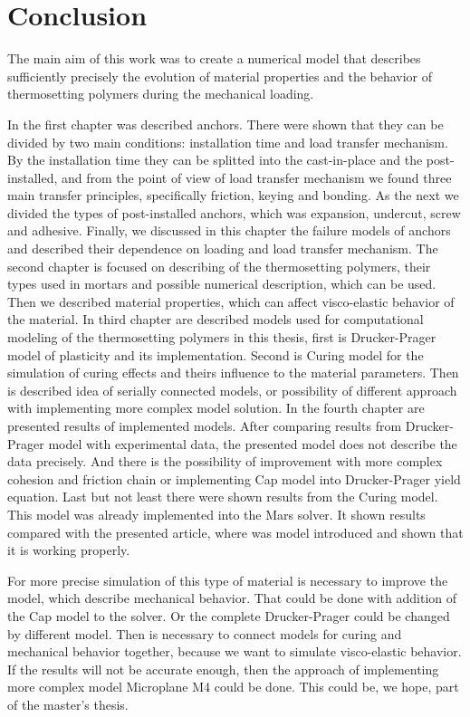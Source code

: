 \thispagestyle{plain}
\section*{Conclusion}
\indent

The main aim of this work was to create a numerical model that describes sufficiently precisely the evolution of material properties and the behavior of thermosetting polymers during the mechanical loading.

In the first chapter was described anchors. There were shown that they can be divided by two main conditions: installation time and load transfer mechanism. By the installation time they can be splitted into the cast-in-place and the post-installed, and from the point of view of load transfer mechanism we found three main transfer principles, specifically friction, keying and bonding. As the next we divided the types of post-installed anchors, which was expansion, undercut, screw and adhesive. Finally, we discussed in this chapter the failure models of anchors and described their dependence on loading and load transfer mechanism. The second chapter is focused on describing of the thermosetting polymers, their types used in mortars and possible numerical description, which can be used. Then we described material properties, which can affect visco-elastic behavior of the material. In third chapter are described models used for computational modeling of the thermosetting polymers in this thesis, first is Drucker-Prager model of plasticity and its implementation. Second is Curing model for the simulation of curing effects and theirs influence to the material parameters. Then is described idea of serially connected models, or possibility of different approach with implementing more complex model solution. In the fourth chapter are presented results of implemented models. After comparing results from Drucker-Prager model with experimental data, the presented model does not describe the data precisely. And there is the possibility of improvement with more complex cohesion and friction chain or implementing Cap model into Drucker-Prager yield equation. Last but not least there were shown results from the Curing model. This model was already implemented into the Mars solver. It shown results compared with the presented article, where was model introduced and shown that it is working properly. 

For more precise simulation of this type of material is necessary to improve the model, which describe mechanical behavior. That could be done with addition of the Cap model to the solver. Or the complete Drucker-Prager could be changed by different model. Then is necessary to connect models for curing and mechanical behavior together, because we want to simulate visco-elastic behavior. If the results will not be accurate enough, then the approach of implementing more complex model Microplane M4 could be done. This could be, we hope, part of the master's thesis. 
